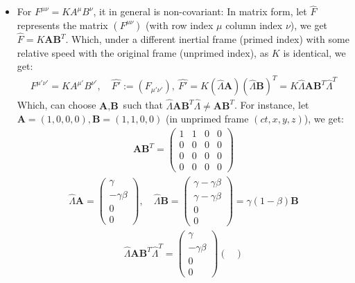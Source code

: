 \documentclass{article}
\begin{document}
\begin{itemize}
    \item For $F^{\mu\nu} = KA^\mu B^\nu$, it in general is non-covariant: In matrix form, let $\hat{F}$ represents the matrix $(F^{\mu\nu})$ (with row index $\mu$ column index $\nu$), we get $\hat{F} = K\textbf{A}\textbf{B}^T$. Which, under a different inertial frame (primed index) with some relative speed with the original frame (unprimed index), as $K$ is identical, we get:
    \begin{align}
        F^{\mu'\nu'} = KA^{\mu'}B^{\nu'},\quad \hat{F'}:= (F_{\mu'\nu'}),\ \hat{F'} = K(\hat{\Lambda}\textbf{A})(\hat{\Lambda}\textbf{B})^T  = K\hat{\Lambda}\textbf{A}\textbf{B}^T\hat{\Lambda}^T
    \end{align}
    Which, can choose $\textbf{A},\textbf{B}$ such that $\hat{\Lambda}\textbf{A}\textbf{B}^T\hat{\Lambda}\neq \textbf{A}\textbf{B}^T$. For instance, let $\textbf{A}=(1,0,0,0),\textbf{B}=(1,1,0,0)$ (in unprimed frame $(ct,x,y,z)$), we get:
    \begin{align}
        \textbf{A}\textbf{B}^T = \begin{pmatrix}
            1&1&0&0\\0&0&0&0\\0&0&0&0\\0&0&0&0
        \end{pmatrix}
    \end{align}
    \begin{align}
        \hat{\Lambda}\textbf{A} = \begin{pmatrix}
            \gamma\\-\gamma\beta\\0\\0
        \end{pmatrix},\quad \hat{\Lambda}\textbf{B} = \begin{pmatrix}
            \gamma-\gamma\beta\\\gamma-\gamma\beta\\0\\0
        \end{pmatrix} = \gamma(1-\beta)\textbf{B}
    \end{align}
    \begin{align}
        \hat{\Lambda}\textbf{A}\textbf{B}^T\hat{\Lambda}^T = \begin{pmatrix}
            \gamma\\-\gamma\beta\\0\\0
        \end{pmatrix}\begin{pmatrix}

\end{pmatrix}
\end{align}
\end{itemize}
\end{document}
